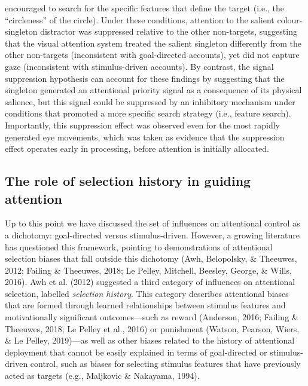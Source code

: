 \documentclass[man, a4paper, noextraspace, 11pt,floatsintext]{apa6}
\begin{document}
encouraged to search for the specific features that define the target
(i.e., the \enquote{circleness} of the circle). Under these conditions,
attention to the salient colour-singleton distractor was suppressed
relative to the other non-targets, suggesting that the visual attention
system treated the salient singleton differently from the other
non-targets (inconsistent with goal-directed accounts), yet did not
capture gaze (inconsistent with stimulus-driven accounts). By contrast,
the signal suppression hypothesis can account for these findings by
suggesting that the singleton generated an attentional priority signal
as a consequence of its physical salience, but this signal could be
suppressed by an inhibitory mechanism under conditions that promoted a
more specific search strategy (i.e., feature search). Importantly, this
suppression effect was observed even for the most rapidly generated eye
movements, which was taken as evidence that the suppression effect
operates early in processing, before attention is initially allocated.

\subsection{The role of selection history in guiding
attention}\label{the-role-of-selection-history-in-guiding-attention}

Up to this point we have discussed the set of influences on attentional
control as a dichotomy: goal-directed versus stimulus-driven. However, a
growing literature has questioned this framework, pointing to
demonstrations of attentional selection biases that fall outside this
dichotomy (Awh, Belopolsky, \& Theeuwes, 2012; Failing \& Theeuwes,
2018; Le Pelley, Mitchell, Beesley, George, \& Wills, 2016). Awh et al.
(2012) suggested a third category of influences on attentional
selection, labelled \emph{selection history}. This category describes
attentional biases that are formed through learned relationships between
stimulus features and motivationally significant outcomes---such as
reward (Anderson, 2016; Failing \& Theeuwes, 2018; Le Pelley et al.,
2016) or punishment (Watson, Pearson, Wiers, \& Le Pelley, 2019)---as
well as other biases related to the history of attentional deployment
that cannot be easily explained in terms of goal-directed or
stimulus-driven control, such as biases for selecting stimulus features
that have previously acted as targets (e.g., Maljkovic \& Nakayama,
1994).
\end{document}

